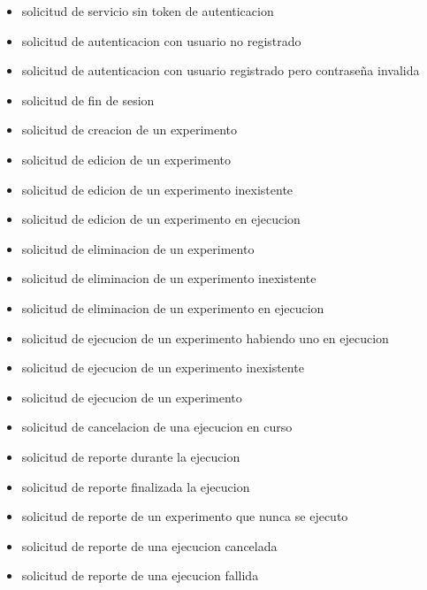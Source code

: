 \begin{itemize}
\item solicitud de servicio sin token de autenticacion
\item solicitud de autenticacion con usuario no registrado
\item solicitud de autenticacion con usuario registrado pero contraseña invalida
\item solicitud de fin de sesion
\item solicitud de creacion de un experimento
\item solicitud de edicion de un experimento
\item solicitud de edicion de un experimento inexistente
\item solicitud de edicion de un experimento en ejecucion
\item solicitud de eliminacion de un experimento
\item solicitud de eliminacion de un experimento inexistente
\item solicitud de eliminacion de un experimento en ejecucion
\item solicitud de ejecucion de un experimento habiendo uno en ejecucion
\item solicitud de ejecucion de un experimento inexistente
\item solicitud de ejecucion de un experimento
\item solicitud de cancelacion de una ejecucion en curso
\item solicitud de reporte durante la ejecucion
\item solicitud de reporte finalizada la ejecucion
\item solicitud de reporte de un experimento que nunca se ejecuto
\item solicitud de reporte de una ejecucion cancelada
\item solicitud de reporte de una ejecucion fallida
\end{itemize}

